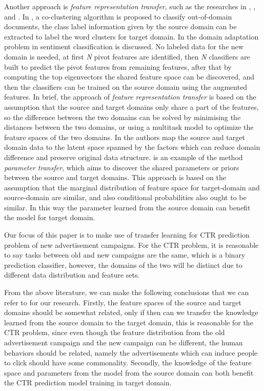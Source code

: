 Another approach is \textit{feature representation transfer}, such as the researches in \cite{dai2007co}, \cite{ando2005high}, and \cite{blitzer2006domain}. In \cite{dai2007co}, a co-clustering algorithm is proposed to classify out-of-domain documents, the class label information given by the source domain can be extracted to label the word clusters for target domain. In \cite{blitzer2006domain} the domain adaptation problem in sentiment classification is discussed. No labeled data for the new domain is needed, at first \textit{N} pivot features are identified, then \textit{N} classifiers are built to predict the pivot features from remaining features, after that by computing the top eigenvectors the shared feature space can be discovered, and then the classifiers can be trained on the source domain using the augmented features. In brief, the approach of \textit{feature representation transfer} is based on the assumption that the source and target domains only share a part of the features, so the difference between the two domains can be solved by minimising the distances between the two domains, or using a multitask model to optimize the feature spaces of the two domains. In \cite{pan2011domain} the authors map the source and target domain data to the latent space spanned by the factors which can reduce domain difference and preserve original data structure. \cite{gao2008knowledge} is an example of the method \textit{parameter transfer}, which aims to discover the shared parameters or priors between the source and target domains. This approach is based on the assumption that the marginal distribution of feature space for target-domain and source-domain are similar, and also conditional probabilities also ought to be similar. In this way the parameter learned from the source domain can benefit the model for target domain. 

Our focus of this paper is to make use of transfer learning for CTR prediction problem of new advertisement campaigns. For the CTR problem, it is reasonable to say tasks between old and new campaigns are the same, which is a binary prediction classifier, however, the domains of the two will be distinct due to different data distribution and feature sets. 

From the above literature, we can make the following conclusions that we can refer to for our research. Firstly, the feature spaces of the source and target domains should be somewhat related, only if then can we transfer the knowledge learned from the source domain to the target domain, this is reasonable for the CTR problem, since even though the feature distribution from the old advertisement campaign and the new campaign can be different, the human behaviors should be related, namely the advertisements which can induce people to click should have some commonality. Secondly, the knowledge of the feature space and parameters from the model from the source domain can both benefit the CTR prediction model training in target domain. 

